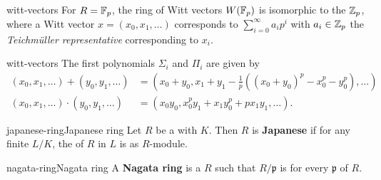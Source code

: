 \begin{example}{witt-vectors}
    For $R = \mathbb{F}_p$, the ring of Witt vectors $W(\mathbb{F}_p)$ is isomorphic to the  $\mathbb{Z}_p$, where a Witt vector $x = (x_0, x_1, \ldots)$ corresponds to $\sum_{i = 0}^{\infty} a_i p^i$ with $a_i \in \mathbb{Z}_p$ the \textit{Teichmüller representative} corresponding to $x_i$. %
\end{example}

\begin{example}{witt-vectors}
    The first polynomials $\Sigma_i$ and $\Pi_i$ are given by
    \[ \begin{aligned}
        (x_0, x_1, \ldots) + (y_0, y_1, \ldots) &= (x_0 + y_0, x_1 + y_1 - \tfrac{1}{p} ((x_0 + y_0)^p - x_0^p - y_0^p), \ldots) \\
        (x_0, x_1, \ldots) \cdot (y_0, y_1, \ldots) &= (x_0 y_0, x_0^p y_1 + x_1 y_0^p + p x_1 y_1, \ldots) .
    \end{aligned} \]
\end{example}

\begin{topic}{japanese-ring}{Japanese ring}
    Let $R$ be a  with  $K$. Then $R$ is \textbf{Japanese} if for any finite  $L/K$, the  of $R$ in $L$ is  as $R$-module.
\end{topic}

\begin{topic}{nagata-ring}{Nagata ring}
    A \textbf{Nagata ring} is a   $R$ such that $R / \mathfrak{p}$ is  for every  $\mathfrak{p}$ of $R$.
\end{topic}
